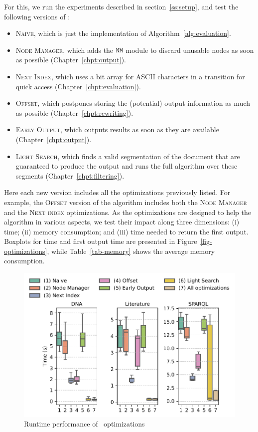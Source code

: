 For this, we run the experiments described in section~\ref{ss:setup}, and test the following versions of \rematch:
\begin{itemize}
	\item \textsc{Naive}, which is just the implementation of  Algorithm~\ref{alg:evaluation}.
	\item \textsc{Node Manager}, which adds the $\mathtt{NM}$ module to discard unusable nodes as soon as possible (Chapter~\ref{chpt:output}).
	\item \textsc{Next Index}, which uses a bit array for ASCII characters in a transition for quick access (Chapter~\ref{chpt:evaluation}).
	\item \textsc{Offset}, which postpones storing the (potential) output information as much as possible (Chapter~\ref{chpt:rewriting}).
	\item \textsc{Early Output}, which outputs results as soon as they are available (Chapter~\ref{chpt:output}).
	\item \textsc{Light Search}, which finds a valid segmentation of the document that are guaranteed to produce the output and runs the full algorithm over these segments (Chapter~\ref{chpt:filtering}).
\end{itemize}

Here each new version includes all the optimizations  previously listed. For example, the \textsc{Offset} version of the algorithm includes both the \textsc{Node Manager} and the \textsc{Next index} optimizations. As the optimizations are designed to help the algorithm in various aspects, we test their impact along three dimensions: (i) time; (ii) memory consumption; and (iii) time needed to return the first output. Boxplots for time and first output time are presented in Figure~\ref{fig-optimizations}, while Table~\ref{tab-memory} shows the average memory consumption.


\begin{figure}[t]
	\centering
	\centering
	\includegraphics[width=.8\textwidth]{figures/versions-time.pdf}
	\caption{Runtime performance of \rematch\ optimizations}
	\label{fig:opt-time}
\end{figure}

